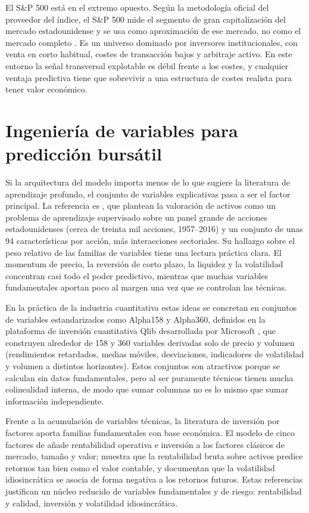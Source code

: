 El S\&P 500 está en el extremo opuesto. Según la metodología oficial del proveedor del
índice, el S\&P 500 mide el segmento de gran capitalización del mercado estadounidense y
se usa como aproximación de ese mercado, no como el mercado completo
\autocite{spdji2025methodology}. Es un universo dominado por inversores institucionales,
con venta en corto habitual, costes de transacción bajos y arbitraje activo. En este
entorno la señal transversal explotable es débil frente a los costes, y cualquier ventaja
predictiva tiene que sobrevivir a una estructura de costes realista para tener valor
económico.

\section{Ingeniería de variables para predicción bursátil}

Si la arquitectura del modelo importa menos de lo que sugiere la literatura de aprendizaje
profundo, el conjunto de variables explicativas pasa a ser el factor principal. La
referencia es \textcite{gu2020empirical}, que plantean la valoración de activos como un
problema de aprendizaje supervisado sobre un panel grande de acciones estadounidenses
(cerca de treinta mil acciones, 1957--2016) y un conjunto de unas 94 características por
acción, más interacciones sectoriales. Su hallazgo sobre el peso relativo de las familias
de variables tiene una lectura práctica clara. El momentum de precio, la reversión de
corto plazo, la liquidez y la volatilidad concentran casi todo el poder predictivo,
mientras que muchas variables fundamentales aportan poco al margen una vez que se
controlan las técnicas.

En la práctica de la industria cuantitativa estas ideas se concretan en conjuntos de
variables estandarizados como Alpha158 y Alpha360, definidos en la plataforma de inversión
cuantitativa Qlib desarrollada por Microsoft \autocite{yang2020qlib}, que construyen alrededor de 158 y 360 variables
derivadas solo de precio y volumen (rendimientos retardados, medias móviles, desviaciones,
indicadores de volatilidad y volumen a distintos horizontes). Estos conjuntos son
atractivos porque se calculan sin datos fundamentales, pero al ser puramente técnicos
tienen mucha colinealidad interna, de modo que sumar columnas no es lo mismo que sumar
información independiente.

Frente a la acumulación de variables técnicas, la literatura de inversión por factores
aporta familias fundamentales con base económica. El modelo de cinco factores de
\textcite{famafrench2015five} añade rentabilidad operativa e inversión a los factores
clásicos de mercado, tamaño y valor; \textcite{novymarx2013other} muestra que la
rentabilidad bruta sobre activos predice retornos tan bien como el valor contable, y
\textcite{ang2006cross} documentan que la volatilidad idiosincrática se asocia de forma
negativa a los retornos futuros. Estas referencias justifican un núcleo reducido de
variables fundamentales y de riesgo: rentabilidad y calidad, inversión y volatilidad
idiosincrática.

